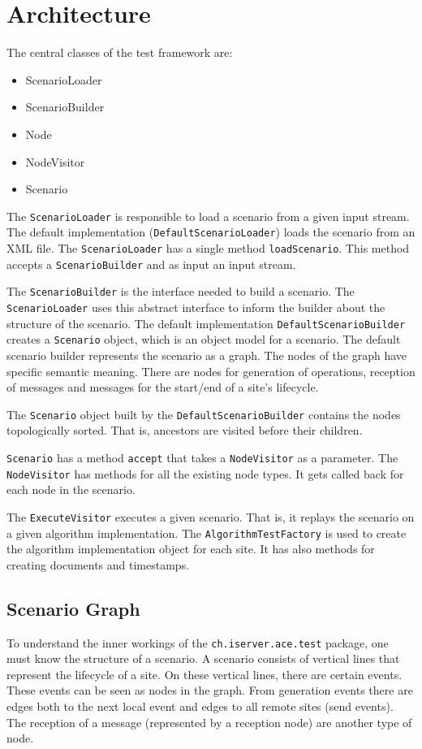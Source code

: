 \documentclass[11pt,a4paper]{article}
\begin{document}
\section{Architecture}
The central classes of the test framework are:

\begin{itemize}
 \item ScenarioLoader
 \item ScenarioBuilder
 \item Node
 \item NodeVisitor
 \item Scenario
\end{itemize}

The \texttt{ScenarioLoader} is responsible to load a scenario from a given input stream. The default implementation (\texttt{DefaultScenarioLoader}) loads the scenario from an XML file. The \texttt{ScenarioLoader} has a single method \texttt{loadScenario}. This method accepts a \texttt{ScenarioBuilder} and as input an input stream.

The \texttt{ScenarioBuilder} is the interface needed to build a scenario. The \texttt{ScenarioLoader} uses this abstract interface to inform the builder about the structure of the scenario. The default implementation \texttt{DefaultScenarioBuilder} creates a \texttt{Scenario} object, which is an object model for a scenario. The default scenario builder represents the scenario as a graph. The nodes of the graph have specific semantic meaning. There are nodes for generation of operations, reception of messages and messages for the start/end of a site's lifecycle.

The \texttt{Scenario} object built by the \texttt{DefaultScenarioBuilder} contains the nodes topologically sorted. That is, ancestors are visited before their children. 

\texttt{Scenario} has a method \texttt{accept} that takes a \texttt{NodeVisitor} as a parameter. The \texttt{NodeVisitor} has methods for all the existing node types. It gets called back for each node in the scenario. 

The \texttt{ExecuteVisitor} executes a given scenario. That is, it replays the scenario on a given algorithm implementation. The \texttt{AlgorithmTestFactory} is used to create the algorithm implementation object for each site. It has also methods for creating documents and timestamps.


\subsection{Scenario Graph}
To understand the inner workings of the \texttt{ch.iserver.ace.test} package, one must know the structure of a scenario. A scenario consists of vertical lines that represent the lifecycle of a site. On these vertical lines, there are certain events. These events can be seen as nodes in the graph. From generation events there are edges both to the next local event and edges to all remote sites (send events). The reception of a message (represented by a reception node) are another type of node.
\end{document}
